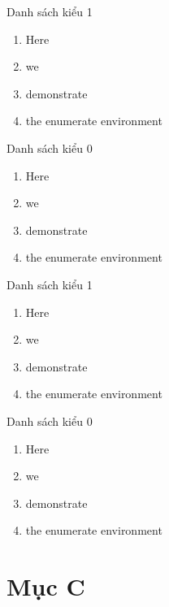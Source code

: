 \IfFileExists{./header.tex}{}{\documentclass[a4paper,style=default]{powerdot}}
\begin{document}
\begin{slide}{Danh sách kiểu 1}
\pause
  \begin{enumerate}[type=1]
    \item<1-> Here
      \item<2-> we
        \item<3-> demonstrate
          \item<4-> the enumerate environment
  \end{enumerate}
\end{slide}

\begin{slide}{Danh sách kiểu 0}
\pause
  \begin{enumerate}[type=0]
    \item<1-> Here
      \item<2-> we
        \item<3-> demonstrate
          \item<4-> the enumerate environment
  \end{enumerate}
\end{slide}

\begin{slide}{Danh sách kiểu 1}
  \begin{enumerate}[type=1]
    \item<1> Here
      \item<2> we
        \item<3> demonstrate
          \item<4> the enumerate environment
  \end{enumerate}
\end{slide}

\begin{slide}{Danh sách kiểu 0}
  \begin{enumerate}[type=0]
    \item<1> Here
      \item<2> we
        \item<3> demonstrate
          \item<4> the enumerate environment
  \end{enumerate}
\end{slide}

\section{Mục C}
\end{document}
